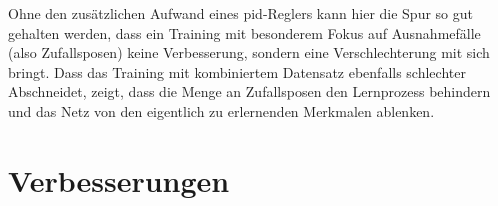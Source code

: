Ohne den zusätzlichen Aufwand eines \acs{pid}-Reglers kann hier die Spur so gut gehalten werden, dass ein Training mit besonderem Fokus auf Ausnahmefälle (also Zufallsposen) keine Verbesserung, sondern eine Verschlechterung mit sich bringt. Dass das Training mit kombiniertem Datensatz ebenfalls schlechter Abschneidet, zeigt, dass die Menge an Zufallsposen den Lernprozess behindern und das Netz von den eigentlich zu erlernenden Merkmalen ablenken.

\section{Verbesserungen}
